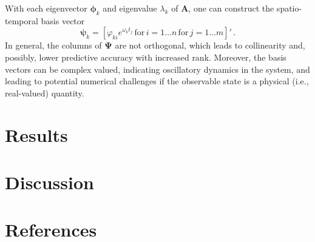 \documentclass[review,number,sort&compress,12pt]{elsarticle}
\begin{document}
With each eigenvector $\boldsymbol{\phi}_k$ and eigenvalue $\lambda_k$ of $\mathbf{A}$, one can construct the spatio-temporal basis vector
\begin{equation}
  \boldsymbol{\psi}_k = 
    [\varphi_{ki} e^{\omega_k t_j} \, \text{for} \, i =1\ldots n \, \text{for} \, j = 1\ldots m]' \, .
\end{equation}
In general, the columns of $\boldsymbol{\Psi}$ are not orthogonal, which leads to collinearity and, possibly, lower predictive accuracy with increased rank.  
Moreover, the basis vectors can be complex valued, indicating oscillatory dynamics in the system, and leading to potential numerical challenges if the observable state is a physical (i.e., real-valued) quantity.

\section{Results}
\label{sec:results}


\section{Discussion}
\label{sec:discusion}


\section*{References}
 

\end{document}
